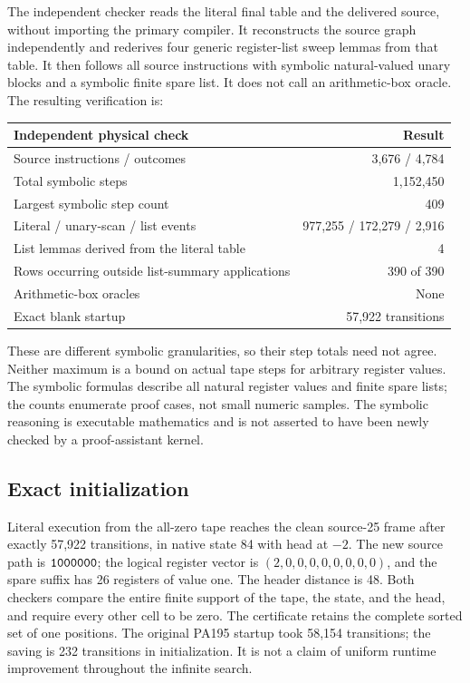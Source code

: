 The independent checker reads the literal final table and the delivered
source, without importing the primary compiler. It reconstructs the source
graph independently and rederives four generic register-list sweep lemmas
from that table. It then follows all source instructions with symbolic
natural-valued unary blocks and a symbolic finite spare list. It does not
call an arithmetic-box oracle. The resulting verification is:

\begin{center}
\begin{tabular}{@{}lr@{}}
\toprule
Independent physical check&Result\\\midrule
Source instructions / outcomes&3,676 / 4,784\\
Total symbolic steps&1,152,450\\
Largest symbolic step count&409\\
Literal / unary-scan / list events&977,255 / 172,279 / 2,916\\
List lemmas derived from the literal table&4\\
Rows occurring outside list-summary applications&390 of 390\\
Arithmetic-box oracles&None\\
Exact blank startup&57,922 transitions\\
\bottomrule
\end{tabular}
\end{center}

These are different symbolic granularities, so their step totals need not
agree. Neither maximum is a bound on actual tape steps for arbitrary
register values. The symbolic formulas describe all natural register
values and finite spare lists; the counts enumerate proof cases, not small
numeric samples. The symbolic reasoning is executable mathematics and is
not asserted to have been newly checked by a proof-assistant kernel.

\subsection{Exact initialization}

Literal execution from the all-zero tape reaches the clean source-25 frame
after exactly 57,922 transitions, in native state 84 with head at $-2$.
The new source path is $\texttt{1000000}$; the logical register vector is
$(2,0,0,0,0,0,0,0,0)$, and the spare suffix has 26 registers of value one.
The header distance is 48. Both checkers compare the entire finite support
of the tape, the state, and the head, and require every other cell to be
zero. The certificate retains the complete sorted set of one positions.
The original PA195 startup took 58,154 transitions; the saving is 232
transitions in initialization. It is not a claim of uniform runtime
improvement throughout the infinite search.


